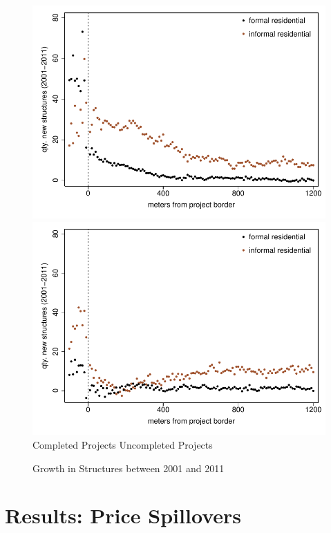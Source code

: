 \documentclass[12pt]{article}
\begin{document}
\begin{figure}
\caption{Growth in Structures between 2001 and 2011}\label{figure:buildingchanges}
\centering
\includegraphics[scale=.58]{figures/bbluplot.pdf}
\includegraphics[scale=.58]{figures/bbluplot_placebo.pdf}\\
\hspace{.7cm} Completed Projects \hspace{4.2cm} Uncompleted Projects
\end{figure}


\section{Results: Price Spillovers}\label{section:resultsprices}
\end{document}
